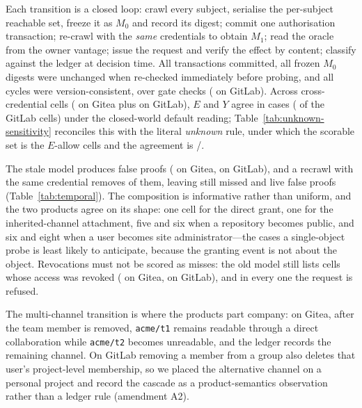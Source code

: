 Each transition is a closed loop: crawl every subject, serialise the per-subject reachable
set, freeze it as $M_0$ and record its digest; commit one authorisation transaction; re-crawl
with the \emph{same} credentials to obtain $M_1$; read the oracle from the owner vantage;
issue the request and verify the effect by content; classify against the ledger at decision
time. All \TmpBothPolicyEvents{} transactions committed, all \TmpBothMzeroVerified{} frozen
$M_0$ digests were unchanged when re-checked immediately before probing, and all
\TmpBothVersionConsistent{} cycles were version-consistent, over \TmpCalChecks{} gate checks
(\TmpGCalGateChecks{} on GitLab). Across \TmpBothCells{} cross-credential cells
(\TmpCells{} on Gitea plus \TmpGCells{} on GitLab), $E$ and $Y$ agree in \TmpBothEeqY{} cases
(\TmpGEeqY{} of the GitLab cells) under the closed-world default reading;
Table~\ref{tab:unknown-sensitivity} reconciles this with the literal \emph{unknown} rule,
under which the scorable set is the \TmpBothLitKnown{} $E$-allow cells and the agreement is
\TmpBothLitEeqY/\TmpBothLitKnown{}.

The stale model produces \TmpBothStaleFP{} false proofs (\TmpStaleFP{} on Gitea, \TmpGStaleFP{}
on GitLab), and a recrawl with the same credential removes \TmpBothFixed{} of them, leaving
\TmpBothStillMiss{} still missed and \TmpBothLiveFP{} live false proofs
(Table~\ref{tab:temporal}). The composition is informative rather than uniform, and the two
products agree on its shape: one cell for the direct grant, one for the inherited-channel
attachment, five and six when a repository becomes public, and six and eight when a user
becomes site administrator---the cases a single-object probe is least likely to anticipate,
because the granting event is not about the object. Revocations must not be scored as misses:
the old model still lists \TmpBothOverRevoke{} cells whose access was revoked
(\TmpOverRevoke{} on Gitea, \TmpGOverRevoke{} on GitLab), and in every one the request is
refused.

The multi-channel transition is where the products part company: on Gitea, after the team
member is removed, \texttt{acme/t1} remains readable through a direct collaboration while
\texttt{acme/t2} becomes unreadable, and the ledger records the remaining channel. On GitLab
removing a member from a group also deletes that user's project-level membership, so we
placed the alternative channel on a personal project and record the cascade as a
product-semantics observation rather than a ledger rule (amendment A2).

